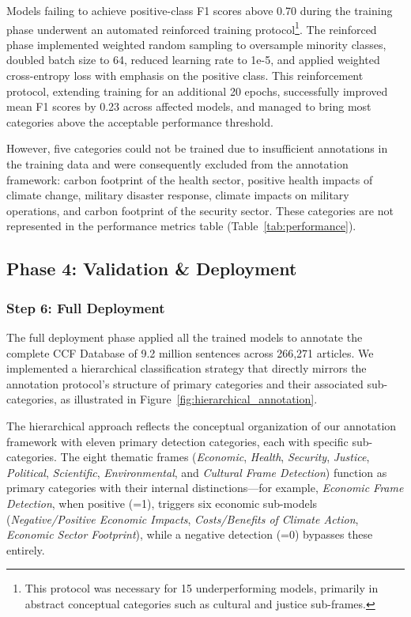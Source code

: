 \documentclass[12pt]{article}
\begin{document}
Models failing to achieve positive-class F1 scores above 0.70 during the training phase underwent an automated reinforced training protocol\footnote{This protocol was necessary for 15 underperforming models, primarily in abstract conceptual categories such as cultural and justice sub-frames.}. The reinforced phase implemented weighted random sampling to oversample minority classes, doubled batch size to 64, reduced learning rate to 1e-5, and applied weighted cross-entropy loss with emphasis on the positive class. This reinforcement protocol, extending training for an additional 20 epochs, successfully improved mean F1 scores by 0.23 across affected models, and managed to bring most categories above the acceptable performance threshold.

However, five categories could not be trained due to insufficient annotations in the training data and were consequently excluded from the annotation framework: carbon footprint of the health sector, positive health impacts of climate change, military disaster response, climate impacts on military operations, and carbon footprint of the security sector. These categories are not represented in the performance metrics table (Table~\ref{tab:performance}).

\subsection{Phase 4: Validation \& Deployment}

\subsubsection{Step 6: Full Deployment}

The full deployment phase applied all the trained models to annotate the complete CCF Database of 9.2 million sentences across 266,271 articles. We implemented a hierarchical classification strategy that directly mirrors the annotation protocol's structure of primary categories and their associated sub-categories, as illustrated in Figure~\ref{fig:hierarchical_annotation}. 

The hierarchical approach reflects the conceptual organization of our annotation framework with eleven primary detection categories, each with specific sub-categories. The eight thematic frames (\emph{Economic}, \emph{Health}, \emph{Security}, \emph{Justice}, \emph{Political}, \emph{Scientific}, \emph{Environmental}, and \emph{Cultural Frame Detection}) function as primary categories with their internal distinctions—for example, \emph{Economic Frame Detection}, when positive (=1), triggers six economic sub-models (\emph{Negative/Positive Economic Impacts}, \emph{Costs/Benefits of Climate Action}, \emph{Economic Sector Footprint}), while a negative detection (=0) bypasses these entirely. 
\end{document}
